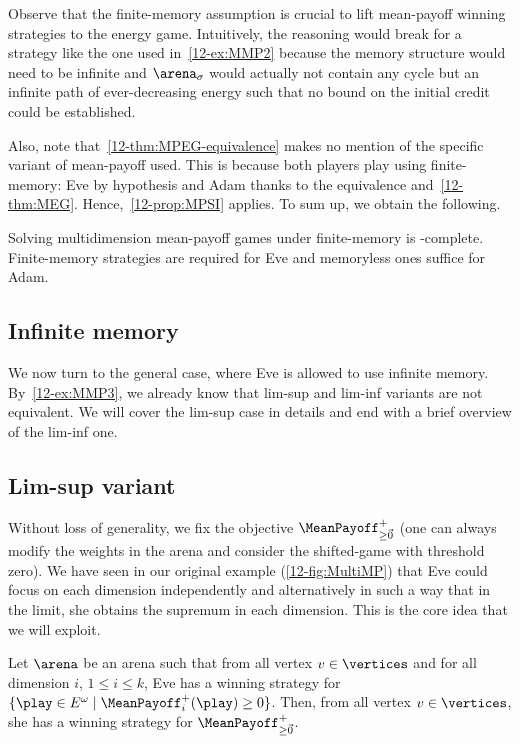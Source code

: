 Observe that the finite-memory assumption is crucial to lift mean-payoff winning strategies to the energy game. Intuitively, the reasoning would break for a strategy like the one used in~\cref{12-ex:MMP2} because the memory structure would need to be infinite and $\arena_\sigma$ would actually not contain any cycle but an infinite path of ever-decreasing energy such that no bound on the initial credit could be established.

Also, note that~\cref{12-thm:MPEG-equivalence} makes no mention of the specific variant of mean-payoff used. This is because both players play using finite-memory: Eve by hypothesis and Adam thanks to the equivalence and~\cref{12-thm:MEG}. Hence,~\cref{12-prop:MPSI} applies. To sum up, we obtain the following.

\begin{corollary}
Solving multidimension mean-payoff games under finite-memory is \coNP-complete. Finite-mem\-ory strategies are required for Eve and memoryless ones suffice for Adam.
\end{corollary}


\subsection{Infinite memory}

We now turn to the general case, where Eve is allowed to use infinite memory. By~\cref{12-ex:MMP3}, we already know that lim-sup and lim-inf variants are not equivalent. We will cover the lim-sup case in details and end with a brief overview of the lim-inf one.

\subsection*{Lim-sup variant}

Without loss of generality, we fix the objective $\MeanPayoff^{+}_{\geq \vec{0}}$ (one can always modify the weights in the arena and consider the shifted-game with threshold zero). We have seen in our original example (\cref{12-fig:MultiMP}) that Eve could focus on each dimension independently and alternatively in such a way that in the limit, she obtains the supremum in each dimension. This is the core idea that we will exploit.

\begin{lemma}
\label{12-lem:MMP-Eve}
Let $\arena$ be an arena such that from all vertex $v \in \vertices$ and for all dimension $i$, $1 \leq i \leq k$, Eve has a winning strategy for $\{\play \in E^\omega \mid \MeanPayoff^{+}_{i}(\play) \geq 0\}$. Then, from all vertex $v \in \vertices$, she has a winning strategy for $\MeanPayoff^{+}_{\geq \vec{0}}$.
\end{lemma}

